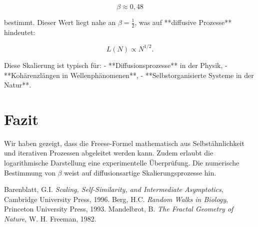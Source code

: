 \documentclass[a4paper,12pt]{article}
\begin{document}
\begin{equation}
    \beta \approx 0,48
\end{equation}

bestimmt. Dieser Wert liegt nahe an \( \beta = \frac{1}{2} \), was auf **diffusive Prozesse** hindeutet:

\begin{equation}
    L(N) \propto N^{1/2}.
\end{equation}

Diese Skalierung ist typisch für:
- **Diffusionsprozesse** in der Physik,
- **Kohärenzlängen in Wellenphänomenen**,
- **Selbstorganisierte Systeme in der Natur**.

\section{Fazit}
Wir haben gezeigt, dass die Freese-Formel mathematisch aus Selbstähnlichkeit und iterativen Prozessen abgeleitet werden kann. Zudem erlaubt die logarithmische Darstellung eine experimentelle Überprüfung. Die numerische Bestimmung von \( \beta \) weist auf diffusionsartige Skalierungsprozesse hin.

\begin{thebibliography}{9}
 Barenblatt, G.I. \textit{Scaling, Self-Similarity, and Intermediate Asymptotics}, Cambridge University Press, 1996.
 Berg, H.C. \textit{Random Walks in Biology}, Princeton University Press, 1993.
 Mandelbrot, B. \textit{The Fractal Geometry of Nature}, W. H. Freeman, 1982.
\end{thebibliography}
\end{document}
